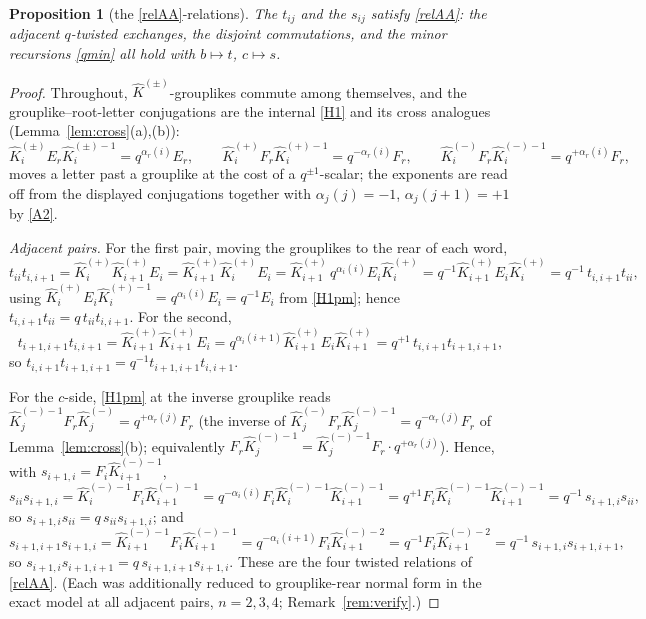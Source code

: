 \documentclass[11pt]{article}
\newtheorem{proposition}[theorem]{Proposition}
\theoremstyle{definition}
\theoremstyle{remark}
\newcommand{\hK}{\hat K}
\begin{document}
\begin{proposition}[the \eqref{relAA}-relations]\label{prop:t}
The $t_{ij}$ and the $s_{ij}$ satisfy \eqref{relAA}: the adjacent
$q$-twisted exchanges, the disjoint commutations, and the minor
recursions \eqref{qmin} all hold with $b\mapsto t$, $c\mapsto s$.
\end{proposition}
\begin{proof}
Throughout, $\hK^{(\pm)}$-grouplikes commute among themselves, and
the grouplike--root-letter conjugations are the internal \eqref{H1}
and its cross analogues (Lemma~\ref{lem:cross}(a),(b)):
\begin{equation}
\hK_i^{(\pm)}E_r\hK_i^{(\pm)-1}=q^{\alpha_r(i)}E_r,\qquad
\hK_i^{(+)}F_r\hK_i^{(+)-1}=q^{-\alpha_r(i)}F_r,\qquad
\hK_i^{(-)}F_r\hK_i^{(-)-1}=q^{+\alpha_r(i)}F_r,
\label{H1pm}\tag{H1$^\pm$}
\end{equation}
moves a letter past a grouplike at the cost of a $q^{\pm1}$-scalar;
the exponents are read off from the displayed conjugations together
with $\alpha_j(j)=-1$, $\alpha_j(j+1)=+1$ by \eqref{A2}.

\emph{Adjacent pairs.}  For the first pair, moving the grouplikes to
the rear of each word,
\[
t_{ii}t_{i,i+1}
=\hK_i^{(+)}\hK_{i+1}^{(+)}E_i
=\hK_{i+1}^{(+)}\hK_i^{(+)}E_i
=\hK_{i+1}^{(+)}\,q^{\alpha_i(i)}E_i\hK_i^{(+)}
=q^{-1}\hK_{i+1}^{(+)}E_i\hK_i^{(+)}
=q^{-1}\,t_{i,i+1}t_{ii},
\]
using $\hK_i^{(+)}E_i\hK_i^{(+)-1}=q^{\alpha_i(i)}E_i=q^{-1}E_i$
from \eqref{H1pm}; hence $t_{i,i+1}t_{ii}=q\,t_{ii}t_{i,i+1}$.
For the second,
\[
t_{i+1,i+1}t_{i,i+1}
=\hK_{i+1}^{(+)}\hK_{i+1}^{(+)}E_i
=q^{\alpha_i(i+1)}\hK_{i+1}^{(+)}E_i\hK_{i+1}^{(+)}
=q^{+1}\,t_{i,i+1}t_{i+1,i+1},
\]
so $t_{i,i+1}t_{i+1,i+1}=q^{-1}t_{i+1,i+1}t_{i,i+1}$.

For the $c$-side, \eqref{H1pm} at the inverse grouplike reads
$\hK_j^{(-)-1}F_r\hK_j^{(-)}=q^{+\alpha_r(j)}F_r$ (the inverse of
$\hK_j^{(-)}F_r\hK_j^{(-)-1}=q^{-\alpha_r(j)}F_r$ of
Lemma~\ref{lem:cross}(b); equivalently $F_r\hK_j^{(-)-1}
=\hK_j^{(-)-1}F_r\cdot q^{+\alpha_r(j)}$).  Hence, with
$s_{i+1,i}=F_i\hK_{i+1}^{(-)-1}$,
\[
s_{ii}s_{i+1,i}
=\hK_i^{(-)-1}F_i\hK_{i+1}^{(-)-1}
=q^{-\alpha_i(i)}F_i\hK_i^{(-)-1}\hK_{i+1}^{(-)-1}
=q^{+1}F_i\hK_i^{(-)-1}\hK_{i+1}^{(-)-1}
=q^{-1}\,s_{i+1,i}s_{ii},
\]
so $s_{i+1,i}s_{ii}=q\,s_{ii}s_{i+1,i}$; and
\[
s_{i+1,i+1}s_{i+1,i}
=\hK_{i+1}^{(-)-1}F_i\hK_{i+1}^{(-)-1}
=q^{-\alpha_i(i+1)}F_i\hK_{i+1}^{(-)-2}
=q^{-1}F_i\hK_{i+1}^{(-)-2}
=q^{-1}\,s_{i+1,i}s_{i+1,i+1},
\]
so $s_{i+1,i}s_{i+1,i+1}=q\,s_{i+1,i+1}s_{i+1,i}$.
These are the four twisted relations of \eqref{relAA}.  (Each was
additionally reduced to grouplike-rear normal form in the exact
model at all adjacent pairs, $n=2,3,4$; Remark~\ref{rem:verify}.)


\end{proof}
\end{document}
